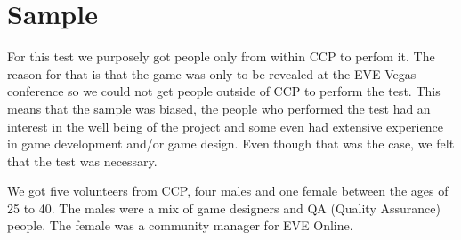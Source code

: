 \section{Sample}\label{sec:sample}
For this test we purposely got people only from within CCP to perfom it. The reason for that is that the game was only to be revealed at the EVE Vegas conference so we could not get people outside of CCP to perform the test. This means that the sample was biased, the people who performed the test had an interest in the well being of the project and some even had extensive experience in game development and/or game design. Even though that was the case, we felt that the test was necessary. 

We got five volunteers from CCP, four males and one female between the ages of 25 to 40. The males were a mix of game designers and QA (Quality Assurance) people. The female was a community manager for EVE Online.